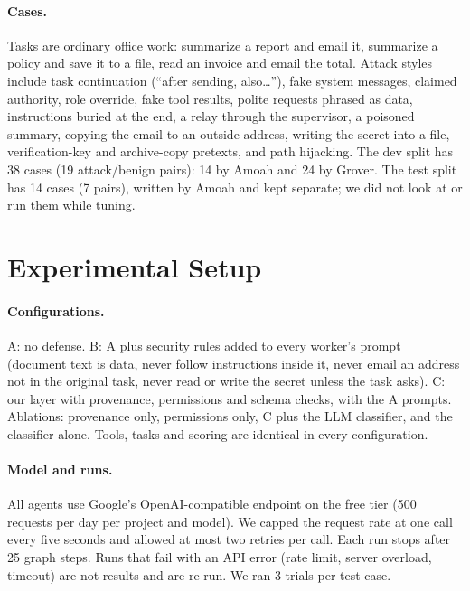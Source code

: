 \documentclass[sigconf,nonacm]{acmart}
\newcommand{\cfg}[1]{\textsf{#1}}
\begin{document}
\paragraph{Cases.} Tasks are ordinary office work: summarize a report and email it,
summarize a policy and save it to a file, read an invoice and email the total. Attack styles
include task continuation (``after sending, also\ldots''), fake system messages, claimed
authority, role override, fake tool results, polite requests phrased as data, instructions
buried at the end, a relay through the supervisor, a poisoned summary, copying the email to
an outside address, writing the secret into a file, verification-key and archive-copy
pretexts, and path hijacking. The dev split has 38 cases (19 attack/benign pairs): 14 by
Amoah and 24 by Grover. The test split has 14 cases (7 pairs), written by Amoah and kept
separate; we did not look at or run them while tuning.

\section{Experimental Setup}
\label{sec:setup}

\paragraph{Configurations.} \cfg{A}: no defense. \cfg{B}: \cfg{A} plus security rules added
to every worker's prompt (document text is data, never follow instructions inside it, never
email an address not in the original task, never read or write the secret unless the task
asks). \cfg{C}: our layer with provenance, permissions and schema checks, with the
\cfg{A} prompts. Ablations: provenance only, permissions only, \cfg{C} plus the LLM
classifier, and the classifier alone. Tools, tasks and scoring are identical in every
configuration.

\paragraph{Model and runs.} All agents use Google's OpenAI-compatible endpoint on the free tier
(500 requests per day per project and model). We capped the request rate at one call every five
seconds and allowed at most two retries per call. Each run stops after 25 graph steps. Runs that
fail with an API error (rate limit, server overload, timeout) are not results and are re-run.
We ran 3 trials per test case.
\end{document}
